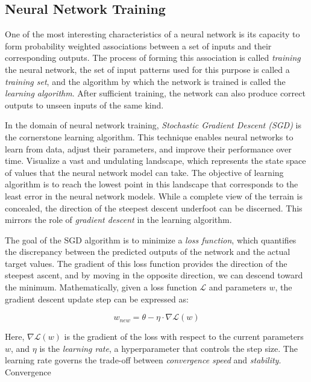 \subsection{Neural Network Training}

One of the most interesting characteristics of a neural network is its capacity to form probability weighted associations between a set of inputs and their corresponding outputs. The process of forming this association is called \textit{training} the neural network, the set of input patterns used for this purpose is called a \textit{training set}, and the algorithm by which the network is trained is called the \textit{learning algorithm}. After sufficient training, the network can also produce correct outputs to unseen inputs of the same kind.

In the domain of neural network training, \textit{Stochastic Gradient Descent (SGD)} is the cornerstone learning algorithm. This technique enables neural networks to learn from data, adjust their parameters, and improve their performance over time. Visualize a vast and undulating landscape, which represents the state space of values that the neural network model can take. The objective of learning algorithm is to reach the lowest point in this landscape that corresponds to the least error in the neural network models. While a complete view of the terrain is concealed, the direction of the steepest descent underfoot can be discerned. This mirrors the role of \textit{gradient descent} in the learning algorithm.

The goal of the SGD algorithm is to minimize a \textit{loss function}, which quantifies the discrepancy between the predicted outputs of the network and the actual target values. The gradient of this loss function provides the direction of the steepest ascent, and by moving in the opposite direction, we can descend toward the minimum. Mathematically, given a loss function $\mathcal{L}$ and parameters $w$, the gradient descent update step can be expressed as:

\begin{equation}
    w_{new} = \theta - \eta \cdot \nabla \mathcal{L}(w)
\end{equation}

Here, $\nabla \mathcal{L}(w)$ is the gradient of the loss with respect to the current parameters $w$, and $\eta$ is the \textit{learning rate}, a hyperparameter that controls the step size. The learning rate governs the trade-off between \textit{convergence speed} and \textit{stability}. Convergence


